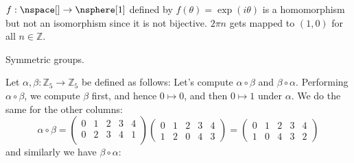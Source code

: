 \documentclass{article}                                                        %
\begin{document}
            \begin{example}
                $f:\nspace[]\rightarrow\nsphere[1]$ defined by
                $f(\theta)=\exp(i\theta)$ is a homomorphism but not an
                isomorphism since it is not bijective. $2\pi{n}$ gets mapped to
                $(1,0)$ for all $n\in\mathbb{Z}$.
            \end{example}
            Symmetric groups.
            \begin{example}
                Let $\alpha,\beta:\mathbb{Z}_{5}\rightarrow\mathbb{Z}_{5}$ be
                defined as follows:
                Let's compute $\alpha\circ\beta$ and $\beta\circ\alpha$.
                Performing $\alpha\circ\beta$, we compute $\beta$ first, and
                hence $0\mapsto{0}$, and then $0\mapsto{1}$ under $\alpha$.
                We do the same for the other columns:
                \begin{equation}
                    \alpha\circ\beta=
                    \begin{pmatrix}
                        0&1&2&3&4\\
                        0&2&3&4&1\\
                    \end{pmatrix}
                    \begin{pmatrix}
                        0&1&2&3&4\\
                        1&2&0&4&3
                    \end{pmatrix}
                    =
                    \begin{pmatrix}
                        0&1&2&3&4\\
                        1&0&4&3&2
                    \end{pmatrix}
                \end{equation}
                and similarly we have $\beta\circ\alpha$:

\end{example}
\end{document}
